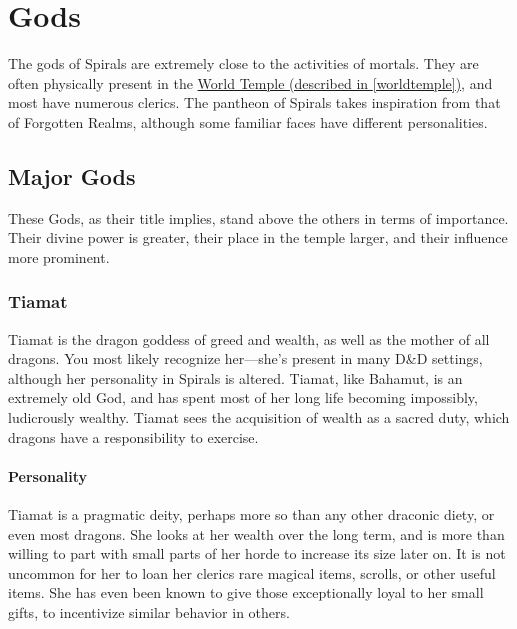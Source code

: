 \chapter{Gods}
The gods of Spirals are extremely close to the activities of mortals.
They are often physically present in the \hyperref[worldtemple]{World Temple (described in \autoref{worldtemple})}, and most have numerous clerics.
The pantheon of Spirals takes inspiration from that of Forgotten Realms, although some familiar faces have different personalities.


\begin{multicols}{2}
\section{Major Gods}
These Gods, as their title implies, stand above the others in terms of importance.
Their divine power is greater, their place in the temple larger, and their influence more prominent.

\subsection*{Tiamat}
\begin{goddesc}
\end{goddesc}

Tiamat is the dragon goddess of greed and wealth, as well as the mother of all dragons.
You most likely recognize her---she's present in many D\&D settings, although her personality in Spirals is  altered.
Tiamat, like Bahamut, is an extremely old God, and has spent most of her long life becoming impossibly, ludicrously wealthy.
Tiamat sees the acquisition of wealth as a sacred duty, which dragons have a responsibility to exercise.

\subsubsection*{Personality}
Tiamat is a pragmatic deity, perhaps more so than any other draconic diety, or even most dragons.
She looks at her wealth over the long term, and is more than willing to part with small parts of her horde to increase its size later on.
It is not uncommon for her to loan her clerics rare magical items, scrolls, or other useful items.
She has even been known to give those exceptionally loyal to her small gifts, to incentivize similar behavior in others.


\end{multicols}
